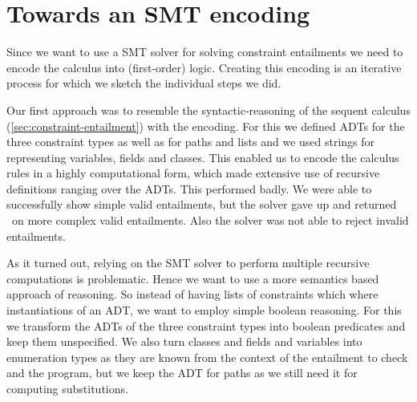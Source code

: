 \documentclass[a4paper]{article}
\begin{document}
\section{Towards an SMT encoding}
Since we want to use a SMT solver for solving constraint entailments we need to
encode the calculus into (first-order) logic.
Creating this encoding is an iterative process for which we sketch the individual steps
we did.

Our first approach was to resemble the syntactic-reasoning of the sequent calculus (\ref{sec:constraint-entailment}) with the encoding.
For this we defined ADTs for the three constraint types as well as for paths and lists
and we used strings for representing variables, fields and classes.
This enabled us to encode the calculus rules in a highly computational form,
which made extensive use of recursive definitions ranging over the ADTs.
This performed badly. We were able to successfully show simple valid entailments,
but the solver gave up and returned \unknown~on more complex valid entailments.
Also the solver was not able to reject invalid entailments.

As it turned out, relying on the SMT solver to perform multiple recursive computations is problematic.
Hence we want to use a more semantics based approach of reasoning.
So instead of having lists of constraints which where instantiations of an ADT,
we want to employ simple boolean reasoning.
For this we transform the ADTs of the three constraint types into boolean predicates
and keep them unspecified. We also turn classes and fields and variables into enumeration types
as they are known from the context of the entailment to check and the program,
but we keep the ADT for paths as we still need it for computing substitutions.
\end{document}
